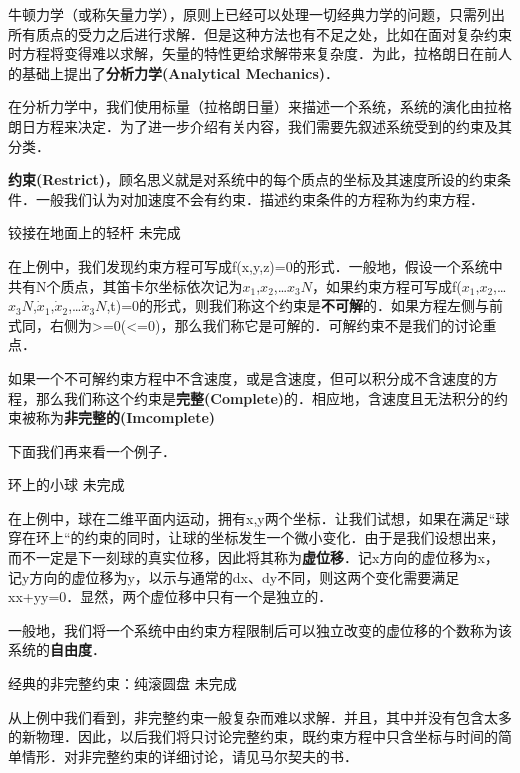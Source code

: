 
\begin{issues}
\issueDraft
\issueTODO
\end{issues}


牛顿力学（或称矢量力学），原则上已经可以处理一切经典力学的问题，只需列出所有质点的受力之后进行求解．但是这种方法也有不足之处，比如在面对复杂约束时方程将变得难以求解，矢量的特性更给求解带来复杂度．为此，拉格朗日在前人的基础上提出了\textbf{分析力学(Analytical Mechanics)}．

在分析力学中，我们使用标量（拉格朗日量）来描述一个系统，系统的演化由拉格朗日方程来决定．为了进一步介绍有关内容，我们需要先叙述系统受到的约束及其分类．

\textbf{约束(Restrict)}，顾名思义就是对系统中的每个质点的坐标及其速度所设的约束条件．一般我们认为对加速度不会有约束．描述约束条件的方程称为约束方程．

\begin{example}{铰接在地面上的轻杆}
未完成
\end{example}

在上例中，我们发现约束方程可写成f(x,y,z)=0的形式．一般地，假设一个系统中共有N个质点，其笛卡尔坐标依次记为$x
_1$,$x_2$,…$x_3N$，如果约束方程可写成f($x_1$,$x_2$,…$x_3N$,$\dot x_1$,$\dot x_2$,…$\dot x_3N$,t)=0的形式，则我们称这个约束是\textbf{不可解}的．如果方程左侧与前式同，右侧为>=0(<=0)，那么我们称它是可解的．可解约束不是我们的讨论重点．

如果一个不可解约束方程中不含速度，或是含速度，但可以积分成不含速度的方程，那么我们称这个约束是\textbf{完整(Complete)}的．相应地，含速度且无法积分的约束被称为\textbf{非完整的(Imcomplete)}

下面我们再来看一个例子．

\begin{example}{环上的小球}
未完成
\end{example}

在上例中，球在二维平面内运动，拥有x,y两个坐标．让我们试想，如果在满足“球穿在环上“的约束的同时，让球的坐标发生一个微小变化．由于是我们设想出来，而不一定是下一刻球的真实位移，因此将其称为\textbf{虚位移}．记x方向的虚位移为\delta x，记y方向的虚位移为\delta y，以示与通常的dx、dy不同，则这两个变化需要满足x\delta x+y\delta y=0．显然，两个虚位移中只有一个是独立的．

一般地，我们将一个系统中由约束方程限制后可以独立改变的虚位移的个数称为该系统的\textbf{自由度}．

\begin{example}{经典的非完整约束：纯滚圆盘}
未完成
\end{example}

从上例中我们看到，非完整约束一般复杂而难以求解．并且，其中并没有包含太多的新物理．因此，以后我们将只讨论完整约束，既约束方程中只含坐标与时间的简单情形．对非完整约束的详细讨论，请见马尔契夫的书．